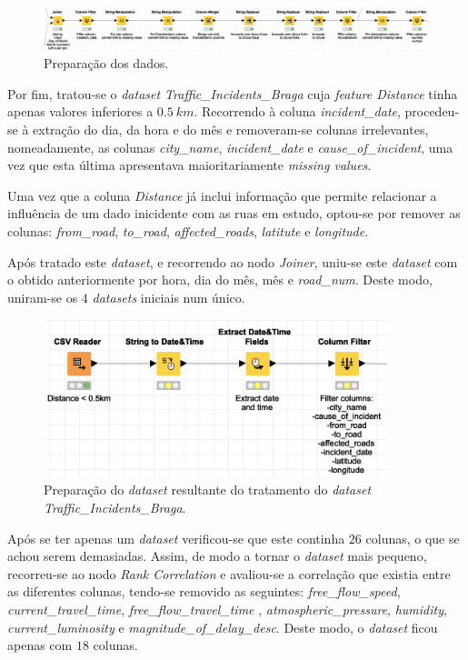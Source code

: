 \documentclass[a4paper, 12pt]{article}
\begin{document}
\begin{figure}[H]
	\centering
	\includegraphics[width=15cm]{prep}
	\caption{Preparação dos dados.}
\end{figure}

Por fim, tratou-se o \textit{dataset Traffic\_Incidents\_Braga} cuja \textit{feature Distance} tinha apenas valores inferiores a $0.5 \ km$. Recorrendo à coluna \textit{incident\_date}, procedeu-se à extração do dia, da hora e do mês e removeram-se colunas irrelevantes, nomeadamente, as colunas \textit{city\_name}, \textit{incident\_date} e \textit{cause\_of\_incident}, uma vez que esta última apresentava maioritariamente \textit{missing values}.

Uma vez que a coluna \textit{Distance} já inclui informação que permite relacionar a influência de um dado inicidente com as ruas em estudo, optou-se por remover as colunas: \textit{from\_road}, \textit{to\_road}, \textit{affected\_roads}, \textit{latitute} e \textit{longitude}.

Após tratado este \textit{dataset}, e recorrendo ao nodo \textit{Joiner}, uniu-se este \textit{dataset} com o obtido anteriormente por hora, dia do mês, mês e \textit{road\_num}. Deste modo, uniram-se os $4$ \textit{datasets} iniciais num único.

\begin{figure}[H]
	\centering
	\includegraphics[width=10cm]{Incident}
	\caption{Preparação do \textit{dataset} resultante do tratamento do \textit{dataset Traffic\_Incidents\_Braga}.}
\end{figure}

Após se ter apenas um \textit{dataset} verificou-se que este continha $26$ colunas, o que se achou serem demasiadas. Assim, de modo a tornar o \textit{dataset} mais pequeno, recorreu-se ao nodo \textit{Rank Correlation} e avaliou-se a correlação que existia entre as diferentes colunas, tendo-se removido as seguintes: \textit{free\_flow\_speed}, \textit{current\_travel\_time}, \textit{free\_flow\_travel\_time }, \textit{atmospheric\_pressure}, \textit{humidity}, \textit{current\_luminosity} e \textit{magnitude\_of\_delay\_desc}. Deste modo, o \textit{dataset} ficou apenas com $18$ colunas.
\end{document}
